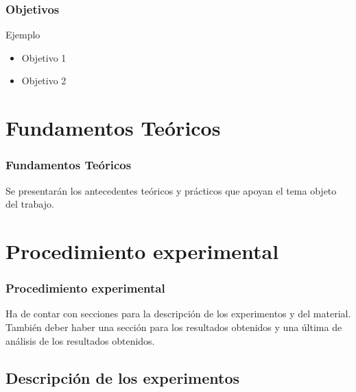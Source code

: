 \documentclass{beamer}
\begin{document}
\begin{frame}

\frametitle{Objetivos }

\begin{block}{Ejemplo}
  \begin{itemize}
  \item
   Objetivo 1 
  \pause

  \item
   Objetivo 2

  \end{itemize}
\end{block}

\end{frame}

\section{Fundamentos Teóricos}

\begin{frame}
\frametitle{Fundamentos Teóricos}

Se presentarán los antecedentes teóricos y prácticos que apoyan el tema objeto
del trabajo.

\end{frame}

\section{Procedimiento experimental}

\begin{frame}
\frametitle{Procedimiento experimental}

Ha de contar con secciones para la descripción de los experimentos y del material.
También deber haber una sección para los resultados obtenidos y una última de
análisis de los resultados obtenidos.

\end{frame}

\subsection{Descripción de los experimentos}
\end{document}
